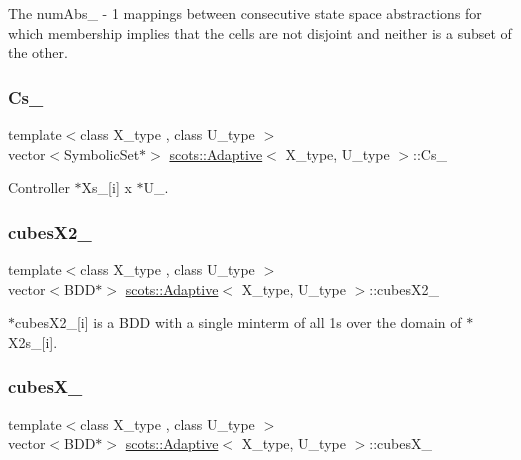 The num\+Abs\+\_\+ -\/ 1 mappings between consecutive state space abstractions for which membership implies that the cells are not disjoint and neither is a subset of the other. \mbox{\label{classscots_1_1Adaptive_a4937d441ac9758f33bcceeb9975fb1ce}} 
\subsubsection{\texorpdfstring{Cs\+\_\+}{Cs\_}}
{\footnotesize\ttfamily template$<$class X\+\_\+type , class U\+\_\+type $>$ \\
vector$<$Symbolic\+Set$\ast$$>$ \hyperlink{classscots_1_1Adaptive}{scots\+::\+Adaptive}$<$ X\+\_\+type, U\+\_\+type $>$\+::Cs\+\_\+}

Controller  $\ast$\+Xs\+\_\+\mbox{[}i\mbox{]} x $\ast$\+U\+\_\+. \mbox{\label{classscots_1_1Adaptive_a6fa7b7542b91ec37ff2358359e425d12}} 
\subsubsection{\texorpdfstring{cubes\+X2\+\_\+}{cubesX2\_}}
{\footnotesize\ttfamily template$<$class X\+\_\+type , class U\+\_\+type $>$ \\
vector$<$B\+DD$\ast$$>$ \hyperlink{classscots_1_1Adaptive}{scots\+::\+Adaptive}$<$ X\+\_\+type, U\+\_\+type $>$\+::cubes\+X2\+\_\+}

$\ast$cubes\+X2\+\_\+\mbox{[}i\mbox{]} is a B\+DD with a single minterm of all 1s over the domain of $\ast$\+X2s\+\_\+\mbox{[}i\mbox{]}. \mbox{\label{classscots_1_1Adaptive_ac82296bd0392bccf2a0e4af9ba70ff37}} 
\subsubsection{\texorpdfstring{cubes\+X\+\_\+}{cubesX\_}}
{\footnotesize\ttfamily template$<$class X\+\_\+type , class U\+\_\+type $>$ \\
vector$<$B\+DD$\ast$$>$ \hyperlink{classscots_1_1Adaptive}{scots\+::\+Adaptive}$<$ X\+\_\+type, U\+\_\+type $>$\+::cubes\+X\+\_\+}

